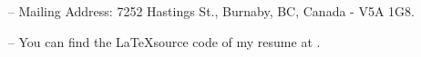 \documentclass[letterpaper]{twentysecondcv} %
\begin{document}
\vfill
\footnotesize{
\begin{itemize}[leftmargin=10px]
    \item[--] Mailing Address: 7252 Hastings St., Burnaby, BC, Canada - V5A 1G8.
    \item[--] You can find the \LaTeX source code of my resume at \color{blue}{http://www.github.com/iocoder/resume}.
\end{itemize}
}
\end{document}
